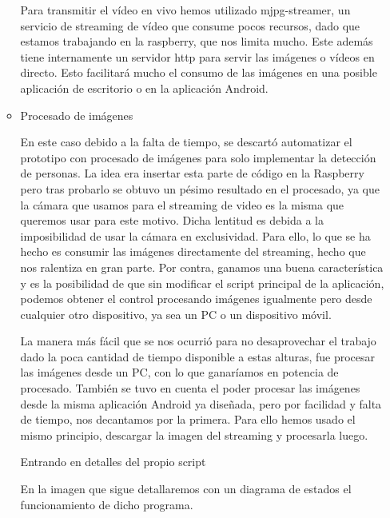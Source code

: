 \documentclass{pclass}
\begin{document}
\begin{itemize}
\begin{itemize}
	Para transmitir el vídeo en vivo hemos utilizado mjpg-streamer, un servicio de streaming de vídeo que consume pocos recursos, dado que estamos trabajando en la raspberry, que nos limita mucho. Este además tiene internamente un servidor http para servir las imágenes o vídeos en directo. Esto facilitará mucho el consumo de las imágenes en una posible aplicación de escritorio o en la aplicación Android.
	
	\medskip
	
	\item Procesado de imágenes
	
		En este caso debido a la falta de tiempo, se descartó automatizar el prototipo con procesado de imágenes para solo implementar la detección de personas. La idea era insertar esta parte de código en la Raspberry pero tras probarlo se obtuvo un pésimo resultado en el procesado, ya que la cámara que usamos para el streaming de video es la misma que queremos usar para este motivo. Dicha lentitud es debida a la imposibilidad de usar la cámara en exclusividad. Para ello, lo que se ha hecho es consumir las imágenes directamente del streaming, hecho que nos ralentiza en gran parte. Por contra, ganamos una buena característica y es la posibilidad de que sin modificar el script principal de la aplicación, podemos obtener el control procesando imágenes igualmente pero desde cualquier otro dispositivo, ya sea un PC o un dispositivo móvil.
		
		La manera más fácil que se nos ocurrió para no desaprovechar el trabajo dado la poca cantidad de tiempo disponible a estas alturas, fue procesar las imágenes desde un PC, con lo que ganaríamos en potencia de procesado. También se tuvo en cuenta el poder procesar las imágenes desde la misma aplicación Android ya diseñada, pero por facilidad y falta de tiempo, nos decantamos por la primera. Para ello hemos usado el mismo principio, descargar la imagen del streaming y procesarla luego. 
		
		Entrando en detalles del propio script
		
		En la imagen que sigue detallaremos con un diagrama de estados el funcionamiento de dicho programa.
		

\end{itemize}
\end{itemize}
\end{document}
